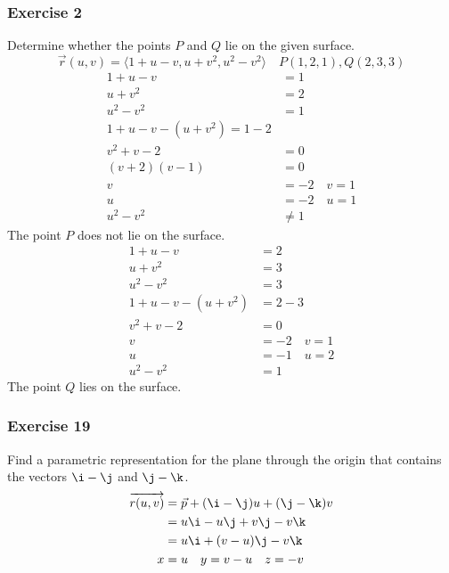 \documentclass{math}
\begin{document}
\subsubsection*{Exercise 2}
Determine whether the points \( P \) and \( Q \) lie on the given surface.
\[ \vec{r}(u,v) = \langle1+u-v,u+v^2,u^2-v^2\rangle \quad P(1,2,1),Q(2,3,3) \]
\begin{align*}
  1+u-v &= 1 \\
  u+v^2 &= 2 \\
  u^2-v^2 &= 1 \\
  1+u-v-(u+v^2) = 1-2 \\
  v^2+v-2 &= 0 \\
  (v+2)(v-1) &= 0 \\
  v &= -2 \quad v = 1 \\
  u &= -2 \quad u = 1 \\
  u^2-v^2 &\ne 1
\end{align*}
The point \( P \) does not lie on the surface.
\begin{align*}
  1+u-v &= 2 \\
  u+v^2 &= 3 \\
  u^2-v^2 &= 3 \\
  1+u-v-(u+v^2) &= 2-3 \\
  v^2+v-2 &= 0 \\
  v &= -2 \quad v = 1 \\
  u &= -1 \quad u = 2 \\
  u^2-v^2 &= 1
\end{align*}
The point \( Q \) lies on the surface.

\subsubsection*{Exercise 19}
Find a parametric representation for the plane through the origin that contains
the vectors \( \i-\j \) and \( \j-\k \).
\begin{align*}
  \overrightarrow{r(u,v)} &= \vec{p}+(\i-\j)u+(\j-\k)v \\
  &= u\i-u\j+v\j-v\k \\
  &= u\i+(v-u)\j-v\k \\
  x &= u \quad y = v-u \quad z = -v \\
\end{align*}
\end{document}
